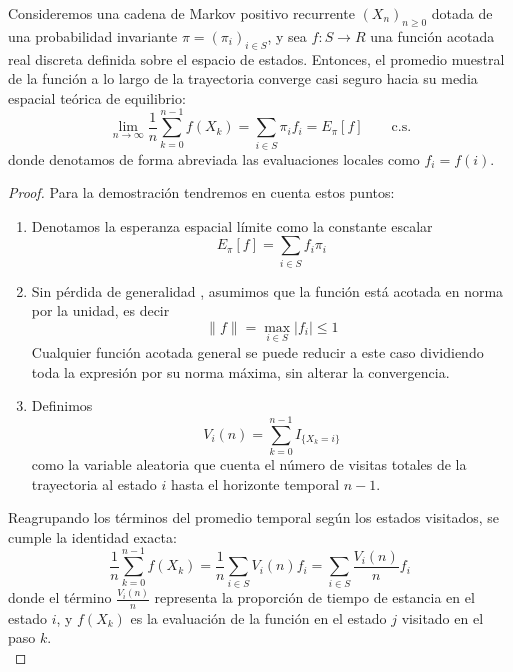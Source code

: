 \documentclass[10pt]{book}
\begin{document}
\begin{coro}
    Consideremos una cadena de Markov positivo recurrente $(X_n)_{n \geq 0}$ dotada de una probabilidad invariante \mbox{$\pi = (\pi_i)_{i \in S}$}, y sea $f: S \to R$ una función acotada real discreta definida sobre el espacio de estados. Entonces, el promedio muestral de la función a lo largo de la trayectoria converge casi seguro hacia su media espacial teórica de equilibrio:
    \[
    \lim_{n \to \infty} \frac{1}{n} \sum_{k=0}^{n-1} f(X_k) = \sum_{i \in S}\pi_i f_i=E_{\pi}[f] \qquad \text{c.s.}
    \]
    donde denotamos de forma abreviada las evaluaciones locales como $f_i = f(i)$.
\begin{proof}
Para la demostración tendremos en cuenta estos puntos:
\begin{enumerate}
    \item Denotamos la esperanza espacial límite como la constante escalar 
    $$E_{\pi}[f] = \sum_{i \in S} f_i \pi_i$$
    \item Sin pérdida de generalidad , asumimos que la función está acotada en norma por la unidad, es decir
    $$\|f\| = \max_{i \in S} |f_i| \le 1$$ 
    Cualquier función acotada general se puede reducir a este caso dividiendo toda la expresión por su norma máxima, sin alterar la convergencia.
    \item Definimos 
    $$V_i(n) = \sum_{k=0}^{n-1} I_{\{X_k = i\}}$$
    como la variable aleatoria que cuenta el número de visitas totales de la trayectoria al estado $i$ hasta el horizonte temporal $n-1$.
\end{enumerate}
Reagrupando los términos del promedio temporal según los estados visitados, se cumple la identidad exacta:
\[
\frac{1}{n} \sum_{k=0}^{n-1} f(X_k) = \frac{1}{n} \sum_{i \in S} V_i(n) f_i = \sum_{i \in S} \frac{V_i(n)}{n} f_i
\]
donde el término $\frac{V_i(n)}{n}$ representa la proporción de tiempo de estancia en el estado $i$, y $f(X_k)$ es la evaluación de la función en el estado $j$ visitado en el paso $k$. \\


\end{proof}
\end{coro}
\end{document}
